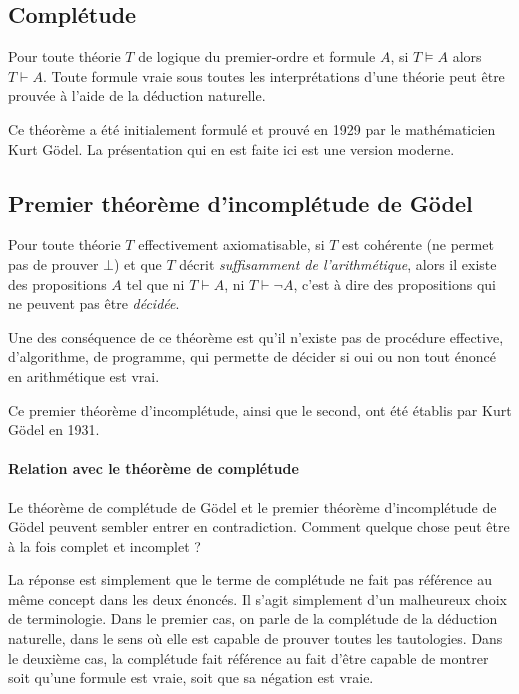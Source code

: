 \subsection{Complétude}

Pour toute théorie $T$ de logique du premier-ordre et formule $A$, si $T \vDash A$ alors $T \vdash A$.
Toute formule vraie sous toutes les interprétations d'une théorie peut être prouvée à l'aide de la déduction naturelle.

Ce théorème a été initialement formulé et prouvé en 1929 par le mathématicien Kurt Gödel.
La présentation qui en est faite ici est une version moderne.

\subsection{Premier théorème d'incomplétude de Gödel}

Pour toute théorie $T$ effectivement axiomatisable, si $T$ est cohérente (ne permet pas de prouver $\bot$) et que $T$ décrit \textit{suffisamment de l'arithmétique}, alors il existe des propositions $A$ tel que ni $T \vdash A$, ni $T \vdash \neg A$, c'est à dire des propositions qui ne peuvent pas être \textit{décidée}.

Une des conséquence de ce théorème est qu'il n'existe pas de procédure effective, d'algorithme, de programme, qui permette de décider si oui ou non tout énoncé en arithmétique est vrai.

Ce premier théorème d'incomplétude, ainsi que le second, ont été établis par Kurt Gödel en 1931.

\paragraph{Relation avec le théorème de complétude}

Le théorème de complétude de Gödel et le premier théorème d'incomplétude de Gödel peuvent sembler entrer en contradiction.
Comment quelque chose peut être à la fois complet et incomplet ?

La réponse est simplement que le terme de complétude ne fait pas référence au même concept dans les deux énoncés.
Il s'agit simplement d'un malheureux choix de terminologie.
Dans le premier cas, on parle de la complétude de la déduction naturelle, dans le sens où elle est capable de prouver toutes les tautologies.
Dans le deuxième cas, la complétude fait référence au fait d'être capable de montrer soit qu'une formule est vraie, soit que sa négation est vraie.

